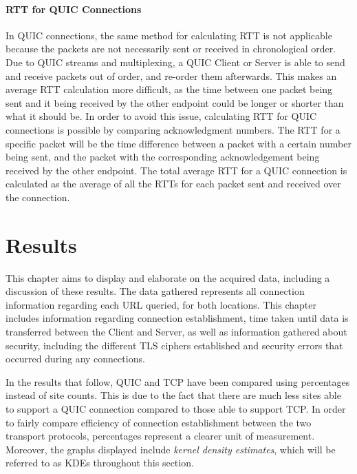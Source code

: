 \documentclass{l4proj}
\begin{document}
\subsubsection{RTT for QUIC Connections} In QUIC connections, the same method for calculating RTT is not applicable because the packets are not necessarily sent or received in chronological order. Due to QUIC streams and multiplexing, a QUIC Client or Server is able to send and receive packets out of order, and re-order them afterwards. This makes an average RTT calculation more difficult, as the time between one packet being sent and it being received by the other endpoint could be longer or shorter than what it should be. In order to avoid this issue, calculating RTT for QUIC connections is possible by comparing acknowledgment numbers. The RTT for a specific packet will be the time difference between a packet with a certain number being sent, and the packet with the corresponding acknowledgement being received by the other endpoint. The total average RTT for a QUIC connection is calculated as the average of all the RTTs for each packet sent and received over the connection.


\chapter{Results} 

This chapter aims to display and elaborate on the acquired data, including a discussion of these results. The data gathered represents all connection information regarding each URL queried, for both locations. This chapter includes information regarding connection establishment, time taken until data is transferred between the Client and Server, as well as information gathered about security, including the different TLS ciphers established and security errors that occurred during any connections.


In the results that follow, QUIC and TCP have been compared using percentages instead of site counts. This is due to the fact that there are much less sites able to support a QUIC connection compared to those able to support TCP. In order to fairly compare efficiency of connection establishment between the two transport protocols, percentages represent a clearer unit of measurement. Moreover, the graphs displayed include \emph{kernel density estimates}, which will be referred to as KDEs throughout this section.
\end{document}
